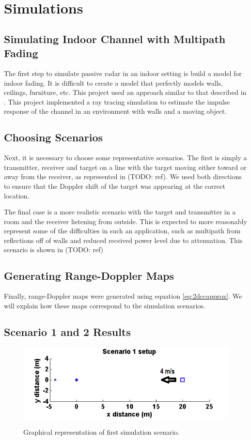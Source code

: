 \documentclass[article,11pt,onecolumn,final]{IEEEtran}
\begin{document}
\section{Simulations}
\subsection{Simulating Indoor Channel with Multipath Fading}
The first step to simulate passive radar in an indoor setting is build a model for indoor fading. It is difficult to create a model that perfectly models walls, ceilings, furniture, etc. This project used an approach similar to that described in \cite{Holt}. This project implemented a ray tracing simulation to estimate the impulse response of the channel in an environment with walls and a moving object. 

\subsection{Choosing Scenarios}
Next, it is necessary to choose some representative scenarios. The first is simply a transmitter, receiver and target on a line with the target moving either toward or away from the receiver, as represented in (TODO: ref). We used both directions to ensure that the Doppler shift of the target was appearing at the correct location.

The final case is a more realistic scenario with the target and transmitter in a room and the receiver listening from outside. This is expected to more reasonably represent some of the difficulties in such an application, such as multipath from reflections off of walls and reduced received power level due to attenuation. This scenario is shown in (TODO: ref)

\subsection{Generating Range-Doppler Maps}
Finally, range-Doppler maps were generated using equation \eqref{eq:2dccapprox}. We will explain how these maps correspond to the simulation scenarios.

\subsection{Scenario 1 and 2 Results}

\begin{figure}[H]
	\caption{Graphical representation of first simulation scenario.}
	\centering
	\includegraphics[width=400pt]{figures/sim1.png}
	\label{fig:sim1}
\end{figure}
\end{document}
